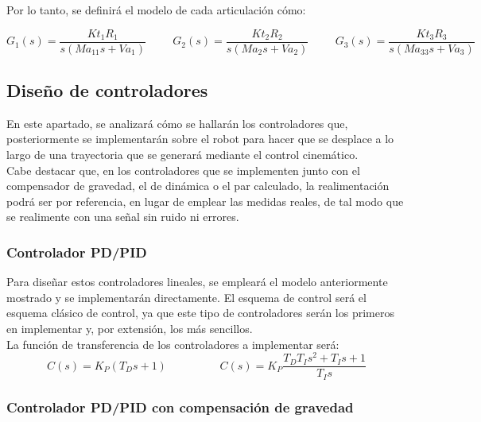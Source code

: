 Por lo tanto, se definirá el modelo de cada articulación cómo:

\begin{equation}
G_{1}(s)=\frac{Kt_{1}R_{1}}{s(Ma_{11}s+Va_{1})} \hspace{1cm} G_{2}(s)=\frac{Kt_{2}R_{2}}{s(Ma_{2}s+Va_{2})} \hspace{1cm} G_{3}(s)=\frac{Kt_{3}R_{3}}{s(Ma_{33}s+Va_{3})}
\end{equation}



\subsection{Diseño de controladores}

En este apartado, se analizará cómo se hallarán los controladores que, posteriormente se implementarán sobre el robot para hacer que se desplace a lo largo de una trayectoria que se generará mediante el control cinemático.\\

Cabe destacar que, en los controladores que se implementen junto con el compensador de gravedad, el de dinámica o el par calculado, la realimentación podrá ser por referencia, en lugar de emplear las medidas reales, de tal modo que se realimente con una señal sin ruido ni errores.\\

\subsubsection{Controlador PD/PID}

Para diseñar estos controladores lineales, se empleará el modelo anteriormente mostrado y se implementarán directamente. El esquema de control será el esquema clásico de control, ya que este tipo de controladores serán los primeros en implementar y, por extensión, los más sencillos. \\

La función de transferencia de los controladores a implementar será:\\

\begin{equation}
C(s)=K_{P}(T_{D}s+1) \hspace{2cm} C(s)=K_{P}\frac{T_{D}T_{I}s^{2}+T_{I}s+1}{T_{I}s}
\end{equation}



\subsubsection{Controlador PD/PID con compensación de gravedad}

